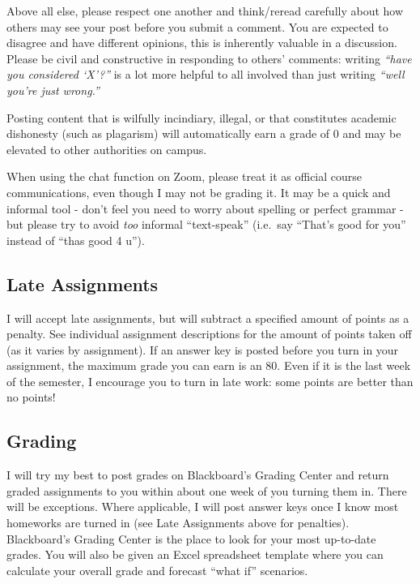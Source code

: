 \documentclass{article}
\begin{document}
Above all else, please respect one another and think/reread carefully
about how others may see your post before you submit a comment. You are
expected to disagree and have different opinions, this is inherently
valuable in a discussion. Please be civil and constructive in responding
to others' comments: writing \emph{``have you considered `X'?''} is a
lot more helpful to all involved than just writing \emph{``well you're
just wrong.''}

Posting content that is wilfully incindiary, illegal, or that
constitutes academic dishonesty (such as plagarism) will automatically
earn a grade of 0 and may be elevated to other authorities on campus.

When using the chat function on Zoom, please treat it as official course
communications, even though I may not be grading it. It may be a quick
and informal tool - don't feel you need to worry about spelling or
perfect grammar - but please try to avoid \emph{too} informal
``text-speak'' (i.e.~say ``That's good for you'' instead of ``thas good
4 u'').

\hypertarget{late-assignments-1}{%
\subsection*{Late Assignments}\label{late-assignments-1}}

I will accept late assignments, but will subtract a specified amount of
points as a penalty. See individual assignment descriptions for the
amount of points taken off (as it varies by assignment). If an answer
key is posted before you turn in your assignment, the maximum grade you
can earn is an 80. Even if it is the last week of the semester, I
encourage you to turn in late work: some points are better than no
points!

\hypertarget{grading}{%
\subsection*{Grading}\label{grading}}

I will try my best to post grades on Blackboard's Grading Center and
return graded assignments to you within about one week of you turning
them in. There will be exceptions. Where applicable, I will post answer
keys once I know most homeworks are turned in (see Late Assignments
above for penalties). Blackboard's Grading Center is the place to look
for your most up-to-date grades. You will also be given an Excel
spreadsheet template where you can calculate your overall grade and
forecast ``what if'' scenarios.
\end{document}

